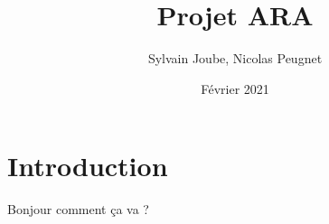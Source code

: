 \documentclass[french]{article}
\title{Projet ARA}
\date{Février 2021}
\author{Sylvain Joube, Nicolas Peugnet}
\begin{document}
\maketitle

\tableofcontents

\section{Introduction}

Bonjour comment ça va ?
\end{document}
